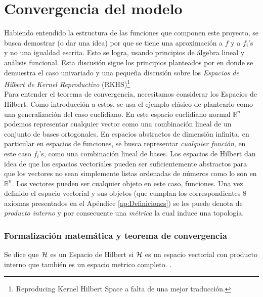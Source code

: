 \documentclass[../Main/Main.tex]{subfiles}
\begin{document}
\section{Convergencia del modelo} \label{sec:Convergencia}

Habiendo entendido la estructura de las funciones que componen este proyecto, se busca demostrar (o dar una idea) por que se tiene una aproximación a $f$ y a $f_i$'s y no una igualdad escrita. Esto se logra, usando principios de álgebra lineal y análisis funcional. Esta discusión sigue los principios planteados por \autocite{bergstrom1985estimation} en donde se demuestra el caso univariado y una pequeña discusión sobre los  \textit{Espacios de Hilbert de Kernel Reproductivo} (RKHS)\footnote{Reproducing Kernel Hilbert Space a falta de una mejor traducción.} \\

Para entender el teorema de convergencia, necesitamos considerar los Espacios de Hilbert. Como introducción a estos, se usa el ejemplo clásico de plantearlo como una generalización del caso euclidiano. En este espacio euclidiano normal $\mathbb{R}^n$ podemos representar cualquier vector como una combinación lineal de un conjunto de bases ortogonales.  En espacios abstractos de dimensión infinita, en particular en espacios de funciones, se busca representar \textit{cualquier función}, en este caso $f_i$'s, como una combinación lineal de bases. Los espacios de Hilbert dan idea de que los espacios vectoriales pueden ser suficientemente abstractos para que los vectores no sean simplemente listas ordenadas de números como lo son en $\mathbb{R}^n$. Los vectores pueden ser cualquier objeto en este caso, funciones. Una vez definido el espacio vectorial y sus objetos (que cumplan los correspondientes 8 axiomas presentados en el Apéndice \ref{ap:Definiciones}) se les puede denota de \textit{producto interno} y por consecuente una \textit{métrica} la cual induce una topología.\\

\subsubsection{Formalización matemática y teorema de convergencia}

Se dice que $\mathcal{H}$ es un Espacio de Hilbert si $\mathcal{H}$ es un espacio vectorial con producto interno que también es un espacio metrico completo. \autocite{rudin1987real}.\\
\end{document}
